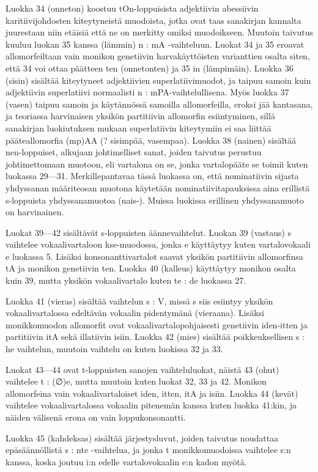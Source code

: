\documentclass[free]{flammie}
\begin{document}
Luokka 34 (onneton) koostuu tOn-loppuisista adjektiivin abessiivin karitiivijohdosten kiteytyneistä muodoista, jotka ovat taas sanakirjan kannalta juurestaan niin
etäisiä että ne on merkitty omiksi muodoikseen. Muutoin taivutus kuuluu luokan 35 kanssa (lämmin) n : mA -vaihteluun. Luokat 34 ja 35 eroavat allomorfeiltaan
vain monikon genetiivin harvakäyttöisten varianttien osalta siten, että 34 voi ottaa
päätteen ten (onnetonten) ja 35 in (lämpimäin).
Luokka 36 (sisin) sisältää kiteytyneet adjektiivien superlatiivimuodot, ja taipuu
samoin kuin adjektiivin superlatiivi normaalisti n : mPA-vaihtelullisena. Myös
luokka 37 (vasen) taipuu samoin ja käytännössä samoilla allomorfeilla, eroksi
jää kantasana, ja teoriassa harvinaisen yksikön partitiivin allomorfin esiintyminen, sillä sanakirjan luokiutuksen mukaan superlatiivin kiteytymiin ei saa liittää
pääteallomorfia (mp)AA (? sisimpää, vasempaa).
Luokka 38 (nainen) sisältää nen-loppuiset, alkujaan johtimelliset sanat, joiden
taivutus perustuu johtimettomaan muotoon, eli vartalona on se, jonka vartalopääte se toimii kuten luokassa 29—31. Merkillepantavaa tässä luokassa on, että nominatiivin sijasta yhdyssanan määriteosan muotona käytetään nominatiivitapauksissa aina erillistä s-loppuista yhdyssanamuotoa (nais-). Muissa luokissa erillinen
yhdyssanamuoto on harvinainen.

Luokat 39—42 sisältävät s-loppuisten äännevaihtelut. Luokan 39 (vastaus) s
vaihtelee vokaalivartaloon kse-muodossa, jonka e käyttäytyy kuten vartalovokaali e luokassa 5. Lisäksi konsonanttivartalot saavat yksikön partitiivin allomorfinsa
tA ja monikon genetiivin ten. Luokka 40 (kalleus) käyttäytyy monikon osalta kuin
39, mutta yksikön vokaalivartalo kuten te : de luokassa 27.

Luokka 41 (vieras) sisältää vaihtelun s : V, missä s siis esiintyy yksikön vokaalivartalossa edeltävän vokaalin pidentymänä (vieraana). Lisäksi monikkomuodon
allomorfit ovat vokaalivartalopohjaisesti genetiivin iden-itten ja partitiivin itA sekä illatiivin isiin. Luokka 42 (mies) sisältää poikkeuksellisen s : he vaihtelun,
muutoin vaihtelu on kuten luokissa 32 ja 33.

Luokat 43—44 ovat t-loppuisten sanojen vaihteluluokat, näistä 43 (ohut) vaihtelee t : (∅)e, mutta muutoin kuten luokat 32, 33 ja 42. Monikon allomorfeina vain
vokaalivartaloiset iden, itten, itA ja isiin. Luokka 44 (kevät) vaihtelee vokaalivartalossa vokaalin pitenemän kanssa kuten luokka 41:kin, ja näiden välisenä erona on vain loppukonsonantti.

Luokka 45 (kahdeksas) sisältää järjestysluvut, joiden taivutus noudattaa epäsäännöllistä s : nte -vaihtelua, ja jonka t monikkomuodoissa vaihtelee s:n kanssa, koska
joutuu i:n edelle vartalovokaalin e:n kadon myötä.
\end{document}
